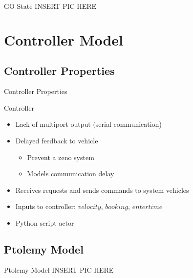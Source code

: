\documentclass{beamer}
\begin{document}
\begin{frame}{GO State}
INSERT PIC HERE
\end{frame}

\section{Controller Model}

\subsection{Controller Properties}

\begin{frame}{Controller Properties}
\begin{block}{Controller}
\begin{itemize}
\item Lack of multiport output (serial communication)
\item Delayed feedback to vehicle
\begin{itemize}
\item Prevent a zeno system
\item Models communication delay
\end{itemize}
\item Receives requests and sends commands to system vehicles
\item Inputs to controller: $velocity$, $booking$, $entertime$ 
\item Python script actor
\end{itemize}
\end{block}
\end{frame}

\subsection{Ptolemy Model}

\begin{frame}{Ptolemy Model}
INSERT PIC HERE
\end{frame}
\end{document}

